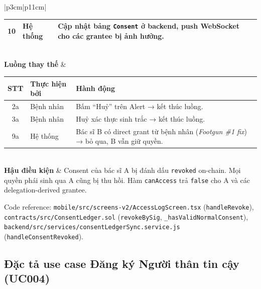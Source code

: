 \documentclass[../DoAn]{subfiles}
\begin{document}
\begin{table}[H]
\begin{tabular}{|p{3cm}|p{11cm}|}
\begin{tabular}{|c|p{2.3cm}|p{6cm}|}
10 & Hệ thống & Cập nhật bảng \texttt{Consent} ở backend, push WebSocket cho các grantee bị ảnh hưởng. \\ \hline
\end{tabular} \\ \hline
\textbf{Luồng thay thế} &
\begin{tabular}{|c|p{2.3cm}|p{6cm}|}
\hline
\textbf{STT} & \textbf{Thực hiện bởi} & \textbf{Hành động} \\ \hline
2a & Bệnh nhân & Bấm ``Huỷ'' trên Alert → kết thúc luồng. \\ \hline
3a & Bệnh nhân & Huỷ xác thực sinh trắc → kết thúc luồng. \\ \hline
9a & Hệ thống & Bác sĩ B có direct grant từ bệnh nhân (\textit{Footgun \#1 fix}) → bỏ qua, B vẫn giữ quyền. \\ \hline
\end{tabular} \\ \hline
\textbf{Hậu điều kiện} & Consent của bác sĩ A bị đánh dấu \texttt{revoked} on-chain. Mọi quyền phái sinh qua A cũng bị thu hồi. Hàm \texttt{canAccess} trả \texttt{false} cho A và các delegation-derived grantee. \\ \hline
\end{tabular}
\end{table}

Code reference: \texttt{mobile/src/screens-v2/AccessLogScreen.tsx} (\texttt{handleRevoke}), \texttt{contracts/src/ConsentLedger.sol} (\texttt{revokeBySig}, \texttt{\_hasValidNormalConsent}), \texttt{backend/src/services/consentLedgerSync.service.js} (\texttt{handleConsentRevoked}).

\subsection{Đặc tả use case Đăng ký Người thân tin cậy (UC004)}
\end{document}

